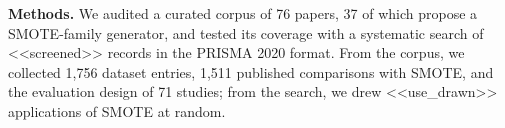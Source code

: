 \textbf{Methods.} We audited a curated corpus of 76 papers, 37 of which propose a SMOTE-family generator, and tested its coverage with a systematic search of <<screened>> records in the PRISMA 2020 format. From the corpus, we collected 1,756 dataset entries, 1,511 published comparisons with SMOTE, and the evaluation design of 71 studies; from the search, we drew <<use_drawn>> applications of SMOTE at random.
